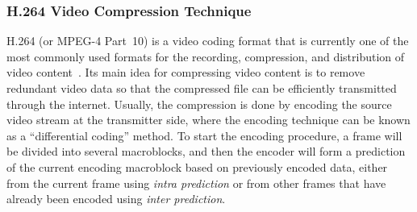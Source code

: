 \subsubsection{H.264 Video Compression Technique}
\label{sec::H264CompressionIntro}
%
H.264 (or MPEG-4 Part~10) is a video coding format that is currently one of the most commonly used formats for the recording, compression, and distribution of video content~\cite{H264Book}.
Its main idea for compressing video content is to remove redundant video data so that the compressed file can be efficiently transmitted through the internet.
Usually, the compression is done by encoding the source video stream at the transmitter side, where the encoding technique can be known as a ``differential coding'' method.
To start the encoding procedure, a frame will be divided into several macroblocks, and then the encoder will form a prediction of the current encoding macroblock based on previously encoded data, either from the current frame using \emph{intra prediction} or from other frames that have already been encoded using \emph{inter prediction}.

